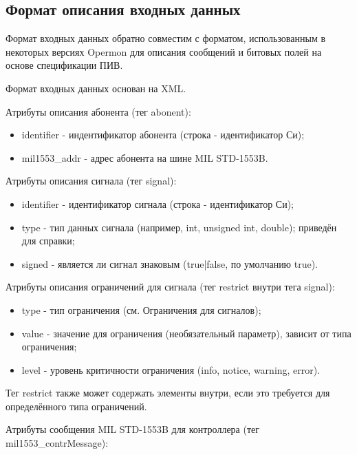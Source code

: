 \subsection{Формат описания входных данных}

Формат входных данных обратно совместим с форматом, использованным в некоторых 
версиях Opermon для описания сообщений и битовых полей на основе спецификации 
ПИВ.

Формат входных данных основан на XML. %



Атрибуты описания абонента (тег abonent):

\begin{itemize}
 \item identifier - индентификатор абонента (строка - идентификатор Си);
 \item mil1553\_addr - адрес абонента на шине MIL STD-1553B.
\end{itemize}

Атрибуты описания сигнала (тег signal):

\begin{itemize}
 \item identifier - идентификатор сигнала (строка - идентификатор Си);
 \item type - тип данных сигнала (например, int, unsigned int, double); 
приведён для справки;
 \item signed - является ли сигнал знаковым (true|false, по умолчанию true).
\end{itemize}

Атрибуты описания ограничений для сигнала (тег restrict внутри тега signal):

\begin{itemize}
 \item type - тип ограничения (см. Ограничения для сигналов); %
 \item value - значение для ограничения (необязательный параметр), зависит от 
типа ограничения;
 \item level - уровень критичности ограничения (info, notice, warning, error).
\end{itemize}

Тег restrict также может содержать элементы внутри, если это требуется для 
определённого типа ограничений.

Атрибуты сообщения MIL STD-1553B для контроллера (тег mil1553\_contrMessage):


